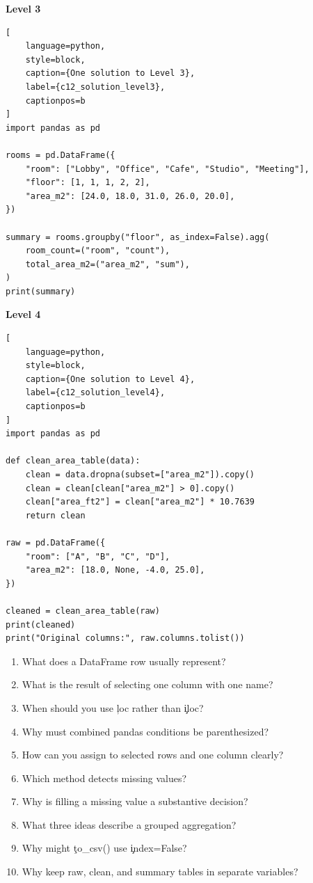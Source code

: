 \textbf{Level 3}

\begin{lstlisting}[
    language=python,
    style=block,
    caption={One solution to Level 3},
    label={c12_solution_level3},
    captionpos=b
]
import pandas as pd

rooms = pd.DataFrame({
    "room": ["Lobby", "Office", "Cafe", "Studio", "Meeting"],
    "floor": [1, 1, 1, 2, 2],
    "area_m2": [24.0, 18.0, 31.0, 26.0, 20.0],
})

summary = rooms.groupby("floor", as_index=False).agg(
    room_count=("room", "count"),
    total_area_m2=("area_m2", "sum"),
)
print(summary)
\end{lstlisting}

\textbf{Level 4}

\begin{lstlisting}[
    language=python,
    style=block,
    caption={One solution to Level 4},
    label={c12_solution_level4},
    captionpos=b
]
import pandas as pd

def clean_area_table(data):
    clean = data.dropna(subset=["area_m2"]).copy()
    clean = clean[clean["area_m2"] > 0].copy()
    clean["area_ft2"] = clean["area_m2"] * 10.7639
    return clean

raw = pd.DataFrame({
    "room": ["A", "B", "C", "D"],
    "area_m2": [18.0, None, -4.0, 25.0],
})

cleaned = clean_area_table(raw)
print(cleaned)
print("Original columns:", raw.columns.tolist())
\end{lstlisting}


\begin{enumerate}
    \item What does a DataFrame row usually represent?
    \item What is the result of selecting one column with one name?
    \item When should you use \c{loc} rather than \c{iloc}?
    \item Why must combined pandas conditions be parenthesized?
    \item How can you assign to selected rows and one column clearly?
    \item Which method detects missing values?
    \item Why is filling a missing value a substantive decision?
    \item What three ideas describe a grouped aggregation?
    \item Why might \c{to_csv()} use \c{index=False}?
    \item Why keep raw, clean, and summary tables in separate variables?
\end{enumerate}

